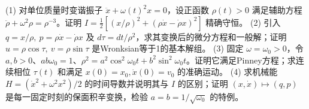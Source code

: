 (1) 对单位质量时变谐振子 \(\ddot x+\omega(t)^2x=0\)，设正函数 \(\rho(t)>0\) 满足辅助方程 \(\ddot\rho+\omega^2\rho=\rho^{-3}\)。证明 \(I=\frac12[(x/\rho)^2+(\rho\dot x-\dot\rho x)^2]\) 精确守恒。
(2) 引入 \(q=x/\rho,\ p=\rho\dot x-\dot\rho x\) 及 \(d\tau=dt/\rho^2\)，求其变换后的微分方程和一般解；证明 \(u=\rho\cos\tau,\ v=\rho\sin\tau\) 是Wronksian等于1的基本解组。
(3) 固定 \(\omega=\omega_0>0\)，令 \(a,b>0\)、\(ab\omega_0=1\)、\(\rho^2=a^2\cos^2\omega_0t+b^2\sin^2\omega_0t\)。证明它满足Pinney方程；求连续相位 \(\tau(t)\) 和满足 \(x(0)=x_0,\dot x(0)=v_0\) 的准确运动。
(4) 求机械能 \(H=(\dot x^2+\omega^2x^2)/2\) 的时间导数并说明其与 \(I\) 的区别；证明 \( (x,\dot x)\mapsto(q,p)\) 是每一固定时刻的保面积辛变换，检验 \(a=b=1/\sqrt{\omega_0}\) 的特例。
